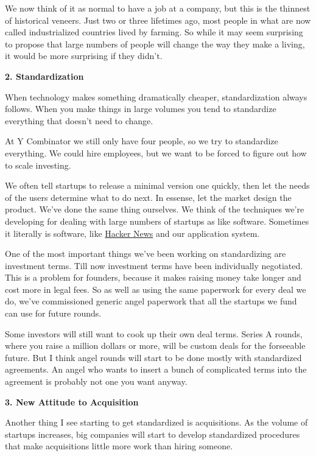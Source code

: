 \documentclass[12pt]{book}
\begin{document}
We now think of it as normal to have a job at a company, but this is the
thinnest of historical veneers. Just two or three lifetimes ago, most
people in what are now called industrialized countries lived by farming.
So while it may seem surprising to propose that large numbers of people
will change the way they make a living, it would be more surprising if
they didn't.

\textbf{2. Standardization}

When technology makes something dramatically cheaper, standardization
always follows. When you make things in large volumes you tend to
standardize everything that doesn't need to change.

At Y Combinator we still only have four people, so we try to standardize
everything. We could hire employees, but we want to be forced to figure
out how to scale investing.

We often tell startups to release a minimal version one quickly, then
let the needs of the users determine what to do next. In essense, let
the market design the product. We've done the same thing ourselves. We
think of the techniques we're developing for dealing with large numbers
of startups as like software. Sometimes it literally is software, like
\href{http://news.ycombinator.com}{Hacker News} and our application
system.

One of the most important things we've been working on standardizing are
investment terms. Till now investment terms have been individually
negotiated. This is a problem for founders, because it makes raising
money take longer and cost more in legal fees. So as well as using the
same paperwork for every deal we do, we've commissioned generic angel
paperwork that all the startups we fund can use for future rounds.

Some investors will still want to cook up their own deal terms. Series A
rounds, where you raise a million dollars or more, will be custom deals
for the forseeable future. But I think angel rounds will start to be
done mostly with standardized agreements. An angel who wants to insert a
bunch of complicated terms into the agreement is probably not one you
want anyway.

\textbf{3. New Attitude to Acquisition}

Another thing I see starting to get standardized is acquisitions. As the
volume of startups increases, big companies will start to develop
standardized procedures that make acquisitions little more work than
hiring someone.
\end{document}
